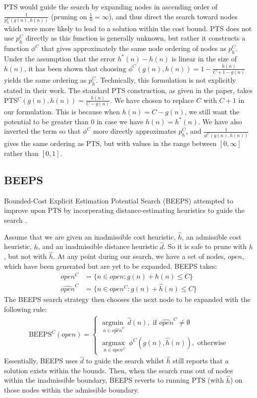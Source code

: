 \documentclass[letterpaper]{article} %
\begin{document}
PTS would guide the search by expanding nodes in ascending order of \(\frac{1}{p^C_h(g(n), h(n))}\) (pruning on \(\frac{1}{0} = \infty\)),
and thus direct the search toward nodes which were more likely to lead to a solution within the cost bound.
PTS does not use \(p^C_h\) directly as this function is generally unknown,
but rather it constructs a function \(\phi^C\) that gives approximately the same node ordering of nodes as \(p^C_h\).
Under the assumption that the error \(h^*(n) - h(n)\)
is linear in the size of \(h(n)\),
it has been shown \cite{stern2011potential} that choosing \(\phi^C(g(n), h(n)) = 1 - \frac{h(n)}{C + 1 - g(n)}\)
yields the same ordering as \(p^C_h\). Technically, this formulation is
not explicitly stated in their work.
The standard PTS construction, as given in the paper, takes PTS\(^C(g(n), h(n)) = \frac{h(n)}{C - g(n)}\).
We have chosen to replace \(C\) with \(C + 1\) in our
formulation. This is because when \(h(n) = C - g(n)\), we still want the potential
to be greater than \(0\) in case we have \(h(n) = h^*(n)\).
We have also inverted the term so that \(\phi^C\) more directly
approximates \(p^C_h\), and \(\frac{1}{\phi^C(g(n), h(n))}\) gives the same ordering
as PTS, but with values in the range between \([0, \infty]\) rather than \([0,1]\).

\subsection{BEEPS}
Bounded-Cost Explicit Estimation Potential Search (BEEPS) attempted to improve upon PTS
by incorperating distance-estimating heuristics to guide the search \cite{thayer2012faster}.

Assume that we are given an inadmissible cost heuristic, \(\hat{h}\),
an admissible cost heuristic, \(h\), and an inadmissible distance heuristic \(\hat{d}\).
So it is safe to prune with \(h\), but not with \(\hat{h}\).
At any point during our search, we have a set of nodes, \(open\), which have been generated but are yet to be expanded.
BEEPS takes:
\begin{align*}
        open^C &= \{n \in open : g(n) + h(n) \leq C\} \\
        \widehat{open}^C &= \{n \in open^C : g(n) + \hat{h}(n)\leq C\}
\end{align*}
The BEEPS search strategy then chooses the next node to be expanded with the following rule:
\begin{align*}
    \text{BEEPS}^C(open) = 
\begin{cases}
  \underset{n \in \widehat{open}^C}{\operatorname{argmin\ }} \hat{d}(n), \text{ if } \widehat{open}^C \not = \emptyset \\
  \underset{n \in open^C}{\operatorname{argmax\ }} \phi^C(g(n), \hat{h}(n)), \text{ otherwise}
\end{cases}
\end{align*}
Essentially, BEEPS uses \(\hat{d}\) to guide the search whilst \(\hat{h}\) still reports that a solution
exists within the bounds. Then, when the search runs out of nodes within the inadmissible boundary,
BEEPS reverts to running PTS (with \(\hat{h}\)) on those nodes within the admissible boundary.
\end{document}
